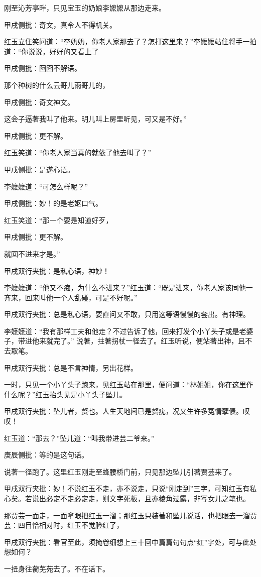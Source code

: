 \begin{parag}
    刚至沁芳亭畔，只见宝玉的奶娘李嬷嬷从那边走来。\begin{note}甲戌侧批：奇文，真令人不得机关。\end{note}红玉立住笑问道：“李奶奶，你老人家那去了？怎打这里来？”李嬷嬷站住将手一拍道：“你说说，好好的又看上了\begin{note}甲戌侧批：囫囵不解语。\end{note}那个种树的什么云哥儿雨哥儿的，\begin{note}甲戌侧批：奇文神文。\end{note}这会子逼著我叫了他来。明儿叫上房里听见，可又是不好。”\begin{note}甲戌侧批：更不解。\end{note}红玉笑道：“你老人家当真的就依了他去叫了？”\begin{note}甲戌侧批：是遂心语。\end{note}李嬷嬷道：“可怎么样呢？”\begin{note}甲戌侧批：妙！的是老妪口气。\end{note}红玉笑道：“那一个要是知道好歹，\begin{note}甲戌侧批：更不解。\end{note}就回不进来才是。”\begin{note}甲戌双行夹批：是私心语，神妙！\end{note}李嬷嬷道：“他又不痴，为什么不进来？”红玉道：“既是进来，你老人家该同他一齐来，回来叫他一个人乱碰，可是不好呢。”\begin{note}甲戌双行夹批：总是私心语，要直问又不敢，只用这等语慢慢的套出。有神理。\end{note}李嬷嬷道：“我有那样工夫和他走？不过告诉了他，回来打发个小丫头子或是老婆子，带进他来就完了。” 说著，拄著拐杖一径去了。红玉听说，便站著出神，且不去取笔。\begin{note}甲戌双行夹批：总是不言神情，另出花样。\end{note}
\end{parag}


\begin{parag}
    一时，只见一个小丫头子跑来，见红玉站在那里，便问道：“林姐姐，你在这里作什么呢？”红玉抬头见是小丫头子坠儿。\begin{note}甲戌双行夹批：坠儿者，赘也。人生天地间已是赘疣，况又生许多冤情孽债。叹叹！\end{note}红玉道：“那去？”坠儿道：“叫我带进芸二爷来。”\begin{note}庚辰侧批：等的是这句话。\end{note}说著一径跑了。这里红玉刚走至蜂腰桥门前，只见那边坠儿引著贾芸来了。\begin{note}甲戌双行夹批：妙！不说红玉不走，亦不说走，只说“刚走到”三字，可知红玉有私心矣。若说出必定不走必定走，则文字死板，且亦棱角过露，非写女儿之笔也。\end{note}那贾芸一面走，一面拿眼把红玉一溜；那红玉只装著和坠儿说话，也把眼去一溜贾芸：四目恰相对时，红玉不觉脸红了，\begin{note}甲戌双行夹批：看官至此，须掩卷细想上三十回中篇篇句句点“红”字处，可与此处想如何？\end{note}一扭身往蘅芜苑去了。不在话下。
\end{parag}


